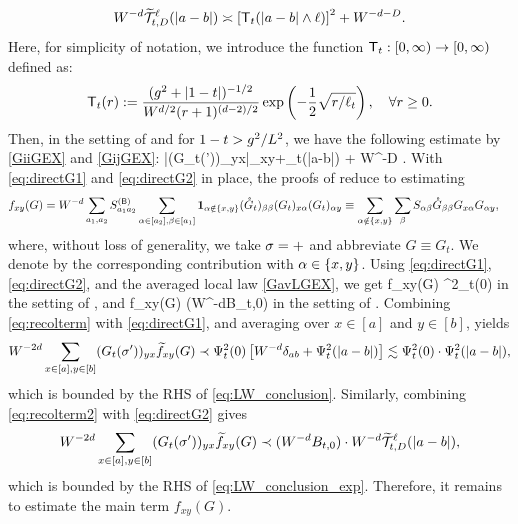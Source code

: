 \[ W^{-d}\widetilde{\mathcal T}_{t,D}^{\ell}(|a-b|)\asymp \left[{{\mathsf T}_{t}(|a-b|\wedge \ell)}\right]^2 + W^{-d-D}.\]
Here, for simplicity of notation, we introduce the function ${\mathsf T}_{t}:[0,\infty)\to [0,\infty)$ defined as: 
\[{\mathsf T}_{t}(r):=\frac{(g^2+|1-t|)^{-1/2}}{W^{ d /2}(r+1)^{(d-2)/2}}\exp\left({-\frac{1}{2}\sqrt{{r}/{\ell_t}}}\right),\quad \forall r\ge 0. \]
Then, in the setting of  and for $1-t> g^2/L^{2}$, we have the following estimate by \eqref{GiiGEX} and \eqref{GijGEX}:
\be\label{eq:directG2}
|(G_t(\sig'))_{yx}|\prec \delta_{xy}+\sT_{t}(|a-b|\wedge \ell) + W^{-D} .
\ee 
With \eqref{eq:directG1} and \eqref{eq:directG2} in place, the proofs of  reduce to estimating
\begin{align}\label{fxyG_sum}
f_{xy}(G)&=W^{-d}\sum_{a_1, a_2}S^{({\mathsf{B}})}_{a_1a_2}\sum_{{\alpha\in [a_2],\beta \in [a_1]}}\mathbf 1_{\alpha\notin\{x,y\}}
({\mathring G}_t)_{\beta\beta} (G_t)_{x\alpha }(G_t)_{\alpha y} \equiv \sum_{\alpha\notin\{x,y\}}\sum_{\beta}S_{\alpha\beta}
{\mathring G}_{\beta\beta} G_{x\alpha}G_{\alpha y},
\end{align} 
where, without loss of generality, we take $\sigma = +$ and abbreviate $G \equiv G_t$. 
We denote by  the corresponding contribution with $\alpha\in\{x,y\}$. 
Using \eqref{eq:directG1}, \eqref{eq:directG2}, and the averaged local law \eqref{GavLGEX}, we get 
\be\label{eq:recolterm} 
\wt f_{xy}(G) \prec \Psi^2_t(0)\cdot {}
\ee
in the setting of , and 
\be\label{eq:recolterm2} 
\wt f_{xy}(G) \prec (W^{-d}B_{t,0}) \cdot {}
\ee
in the setting of .
Combining \eqref{eq:recolterm} with \eqref{eq:directG1}, and averaging over $x\in[a]$ and $y\in [b]$, yields  
\begin{align}\label{eq:recoltermwt}
W^{-2d} \sum_{x\in [a],y\in [b]} (G_t(\sigma'))_{yx} \widetilde f_{xy}(G) \prec \Psi^2_t(0)\left[W^{-d}\delta_{ab}+\Psi_t^2(|a-b|)\right] \lesssim \Psi^2_t(0)\cdot \Psi_t^2(|a-b|), 
\end{align} 
which is bounded by the RHS of \eqref{eq:LW_conclusion}. Similarly, combining \eqref{eq:recolterm2} with \eqref{eq:directG2} gives
\begin{align}\label{eq:recoltermwt2}
W^{-2d} \sum_{x\in [a],y\in [b]} (G_t(\sigma'))_{yx} \widetilde f_{xy}(G) \prec (W^{-d}B_{t,0}) \cdot W^{-d} \widetilde{\mathcal T}_{t,D}^{\ell}(|a-b|), 
\end{align}
which is bounded by the RHS of \eqref{eq:LW_conclusion_exp}. Therefore, it remains to estimate the main term $f_{xy}(G)$. 



